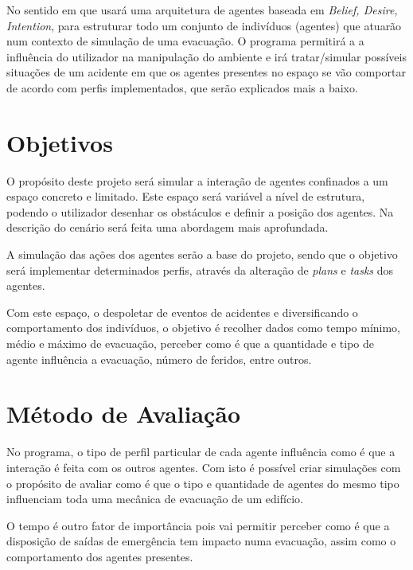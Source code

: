 \documentclass[a4paper,11pt]{article}
\begin{document}
No sentido em que usará uma arquitetura de agentes baseada em \textit{Belief, Desire, Intention}, para estruturar todo um conjunto de indivíduos (agentes) que atuarão num contexto de simulação de uma evacuação. O programa permitirá a a influência do utilizador na manipulação do ambiente e irá tratar/simular possíveis situações de um acidente em que os agentes presentes no espaço se vão comportar de acordo com perfis implementados, que serão explicados mais a baixo.

\section{Objetivos}
O propósito deste projeto será simular a interação de agentes confinados a um espaço concreto e limitado. Este espaço será variável a nível de estrutura, podendo o utilizador desenhar os obstáculos e definir a posição dos agentes. Na descrição do cenário será feita uma abordagem mais aprofundada.

A simulação das ações dos agentes serão a base do projeto, sendo que o objetivo será implementar determinados perfis, através da alteração de \textit{plans} e \textit{tasks} dos agentes.

Com este espaço, o despoletar de eventos de acidentes e diversificando o comportamento dos indivíduos, o objetivo é recolher dados como tempo mínimo, médio e máximo de evacuação, perceber como é que a quantidade e tipo de agente influência a evacuação, número de feridos, entre outros.

\section{Método de Avaliação}
No programa, o tipo de perfil particular de cada agente influência como é que a interação é feita com os outros agentes.
Com isto é possível criar simulações com o propósito de avaliar como é que o tipo e quantidade de agentes do mesmo tipo influenciam toda uma mecânica de evacuação de um edifício.

O tempo é outro fator de importância pois vai permitir perceber como é que a disposição de saídas de emergência tem impacto numa evacuação, assim como o comportamento dos agentes presentes.
\end{document}
